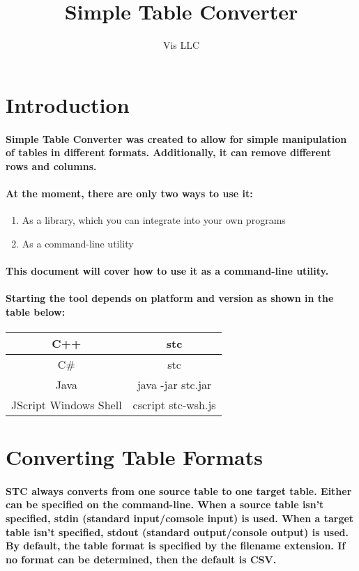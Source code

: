 \documentclass[11pt]{article}
\title{Simple Table Converter}
\author{Vis LLC}
\begin{document}
\maketitle

\section{Introduction}

\paragraph{Simple Table Converter was created to allow for simple manipulation of tables in different formats.  Additionally, it can remove different rows and columns.}
\paragraph{At the moment, there are only two ways to use it:}
\begin{enumerate}
    \item As a library, which you can integrate into your own programs
    \item As a command-line utility
\end{enumerate}
\paragraph{This document will cover how to use it as a command-line utility.}
\paragraph{Starting the tool depends on platform and version as shown in the table below:}

\begin{center}
\begin{tabular}{ | c | c | }
\hline
C++ & stc \\
\hline
C\# & stc \\
\hline
Java & java -jar stc.jar \\
\hline
JScript Windows Shell & cscript stc-wsh.js \\
\hline
\end{tabular}
\end{center}

\section{Converting Table Formats}
\paragraph{STC always converts from one source table to one target table.  Either can be specified on the command-line.  When a source table isn’t specified, stdin (standard input/comsole input) is used.  When a target table isn’t specified, stdout (standard output/console output) is used.  By default, the table format is specified by the filename extension.  If no format can be determined, then the default is CSV.}
\end{document}
